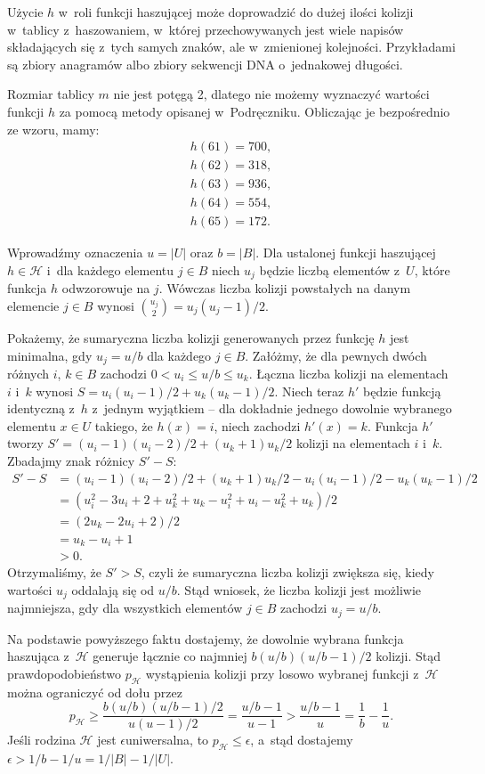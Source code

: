 Użycie $h$ w~roli funkcji haszującej może doprowadzić do dużej ilości kolizji w~tablicy z~haszowaniem, w~której przechowywanych jest wiele napisów składających się z~tych samych znaków, ale w~zmienionej kolejności.
Przykładami są zbiory anagramów albo zbiory sekwencji DNA o~jednakowej długości.

\exercise %
Rozmiar tablicy $m$ nie jest potęgą 2, dlatego nie możemy wyznaczyć wartości funkcji $h$ za pomocą metody opisanej w~Podręczniku.
Obliczając je bezpośrednio ze wzoru, mamy:
\begin{gather*}
	h(61) = 700, \\
	h(62) = 318, \\
	h(63) = 936, \\
	h(64) = 554, \\
	h(65) = 172.
\end{gather*}

\exercise %
Wprowadźmy oznaczenia $u=|U|$ oraz $b=|B|$.
Dla ustalonej funkcji haszującej $h\in\mathcal{H}$ i~dla każdego elementu $j\in B$ niech $u_j$ będzie liczbą elementów z~$U$, które funkcja $h$ odwzorowuje na $j$.
Wówczas liczba kolizji powstałych na danym elemencie $j\in B$ wynosi $\binom{u_j}{2}=u_j(u_j-1)/2$.

Pokażemy, że sumaryczna liczba kolizji generowanych przez funkcję $h$ jest minimalna, gdy $u_j=u/b$ dla każdego $j\in B$.
Załóżmy, że dla pewnych dwóch różnych $i$, $k\in B$ zachodzi $0<u_i\le u/b\le u_k$.
Łączna liczba kolizji na elementach $i$ i~$k$ wynosi $S=u_i(u_i-1)/2+u_k(u_k-1)/2$.
Niech teraz $h'$ będzie funkcją identyczną z~$h$ z~jednym wyjątkiem -- dla dokładnie jednego dowolnie wybranego elementu $x\in U$ takiego, że $h(x)=i$, niech zachodzi $h'(x)=k$.
Funkcja $h'$ tworzy $S'=(u_i-1)(u_i-2)/2+(u_k+1)u_k/2$ kolizji na elementach $i$ i~$k$.
Zbadajmy znak różnicy $S'-S$:
\begin{align*}
	S'-S &= (u_i-1)(u_i-2)/2+(u_k+1)u_k/2-u_i(u_i-1)/2-u_k(u_k-1)/2 \\
	&= (u_i^2-3u_i+2+u_k^2+u_k-u_i^2+u_i-u_k^2+u_k)/2 \\
	&= (2u_k-2u_i+2)/2 \\
	&= u_k-u_i+1 \\
	&> 0.
\end{align*}
Otrzymaliśmy, że $S'>S$, czyli że sumaryczna liczba kolizji zwiększa się, kiedy wartości $u_j$ oddalają się od $u/b$.
Stąd wniosek, że liczba kolizji jest możliwie najmniejsza, gdy dla wszystkich elementów $j\in B$ zachodzi $u_j=u/b$.

Na podstawie powyższego faktu dostajemy, że dowolnie wybrana funkcja haszująca z~$\mathcal{H}$ generuje łącznie co najmniej $b(u/b)(u/b-1)/2$ kolizji.
Stąd prawdopodobieństwo $p_{\mathcal{H}}$ wystąpienia kolizji przy losowo wybranej funkcji z~$\mathcal{H}$ można ograniczyć od dołu przez
\[
	p_{\mathcal{H}} \ge \frac{b(u/b)(u/b-1)/2}{u(u-1)/2} = \frac{u/b-1}{u-1} > \frac{u/b-1}{u} = \frac{1}{b}-\frac{1}{u}.
\]
Jeśli rodzina $\mathcal{H}$ jest $\epsilon$\nbhyphen uniwersalna, to $p_{\mathcal{H}}\le\epsilon$, a~stąd dostajemy $\epsilon>1/b-1/u=1/|B|-1/|U|$.

